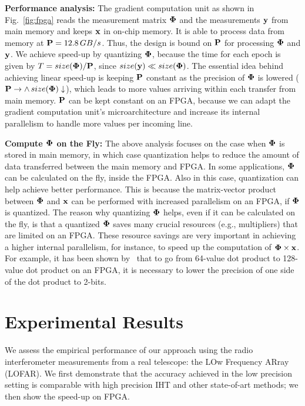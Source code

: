 \documentclass{article}
\begin{document}
{{\bf Performance analysis:} The gradient computation unit as shown in Fig.~\ref{fig:fpga} reads the measurement matrix ${\bf \Phi}$ and the measurements ${\bf y}$ from main memory and keeps ${\bf x}$ in on-chip memory. It is able to process data from memory at ${\bf P}=12.8\,GB/s$. Thus, the design is bound on ${\bf P}$ for processing ${\bf \Phi}$ and ${\bf y}$. We achieve speed-up by quantizing ${\bf \Phi}$, because the time for each epoch is given by
$T = size({\bf \Phi})/{\bf P}$, since $size({\bf y}) \ll size({\bf \Phi})$. The essential idea behind achieving linear speed-up is keeping ${\bf P}$ constant as the precision of ${\bf \Phi}$ is lowered (${\bf P}\to \land \, size({\bf \Phi})\downarrow$), which leads to more values arriving within each transfer from main memory. ${\bf P}$ can be kept constant on an FPGA, because we can adapt the gradient computation unit's microarchitecture and increase its internal parallelism to handle more values per incoming line. 


{\bf Compute ${\bf \Phi}$ on the Fly:} The above analysis focuses on the case when ${\bf \Phi}$ 
is stored in main memory, in which case quantization helps to reduce the amount of 
data transferred between the main memory and FPGA. In some applications, ${\bf \Phi}$
can be calculated on the fly, inside the FPGA. Also in this case, quantization can help 
achieve better performance.
This is because the matrix-vector product between ${\bf \Phi}$ and ${\bf x}$ can 
be performed with increased parallelism on an FPGA, if ${\bf \Phi}$ is quantized.
The reason why quantizing ${\bf \Phi}$ helps, even if it can be calculated on the fly, is
that a quantized ${\bf \Phi}$ saves many crucial resources (e.g., multipliers) that
are limited on an FPGA. These resource savings are very important in achieving a higher 
internal parallelism, for instance, to speed up the computation of ${\bf \Phi}\times{\bf x}$. 
For example, it has been shown by~\cite{kara2017fpga} that to go from 64-value dot product to 128-value
dot product on an FPGA, it is necessary to lower the precision of one side of the dot product to 2-bits.

\section{Experimental Results}\label{section_experiments}

We assess the empirical performance of our approach using the radio interferometer measurements from a real telescope: the LOw Frequency ARray (LOFAR). We first demonstrate that the accuracy achieved in the low precision setting is comparable with high precision IHT and other state-of-art methods; we then show the speed-up on FPGA.

}
\end{document}
